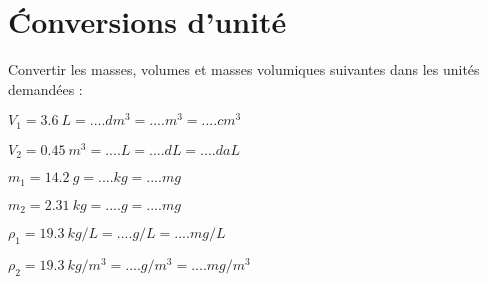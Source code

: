 \section{\'Conversions d'unité}\label{ex:convert}

Convertir les masses, volumes et masses volumiques suivantes dans les unités demandées :
\begin{questions}
	\question $V_1 = \num{3.6}\  L = .... dm^3 = .... m^3 = ....cm^3 $
	
	\question $V_2 = \num{0.45}\  m^3 = .... L = .... dL = ....daL $
	
	\question $m_1 = \num{14.2}\  g = .... kg = .... mg $
	
	\question $m_2 = \num{2.31}\  kg = .... g = .... mg $
	
	\question $\rho _1 = \num{19.3}\  kg/L = .... g/L = .... mg/L $
	
	\question $\rho _2 = \num{19.3}\  kg/m^3 = .... g/m^3 = .... mg/m^3 $
\end{questions}
